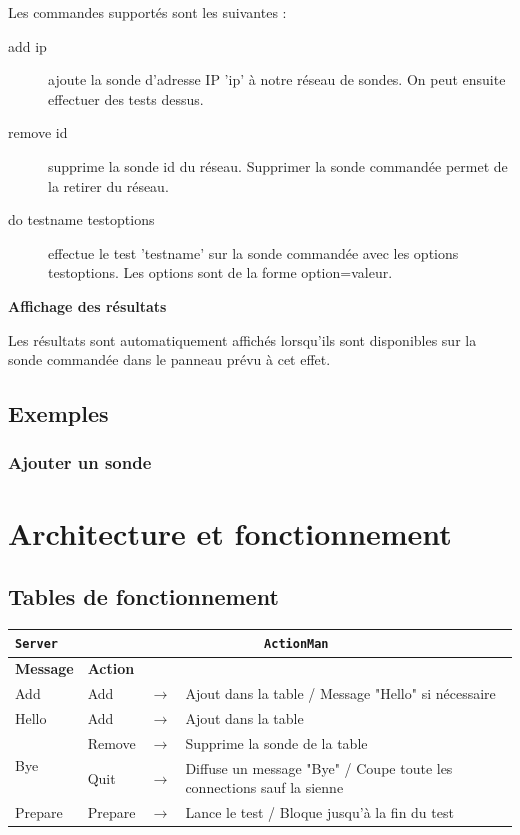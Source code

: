 \documentclass[a4paper,11pt]{article}
\newcommand{\cd}[1]{\texttt{#1}}
\begin{document}
\FloatBarrier
Les commandes supportés sont les suivantes :
\begin{description}
\item[add ip] ajoute la sonde d'adresse IP 'ip' à notre réseau de sondes. On peut ensuite effectuer des tests dessus.
\item[remove id] supprime la sonde id du réseau. Supprimer la sonde commandée permet de la retirer du réseau.
\item[do testname testoptions] effectue le test 'testname' sur la sonde commandée avec les options testoptions. Les options sont de la forme option=valeur.
\end{description}
\vspace{2ex}
\textbf{Affichage des résultats}

Les résultats sont automatiquement affichés lorsqu'ils sont disponibles sur la sonde commandée dans le panneau prévu à cet effet.


\subsection{Exemples}

\subsubsection{Ajouter un sonde}






\newpage
\section{Architecture et fonctionnement}

\subsection{Tables de fonctionnement}
\begin{center}
\begin{tabular}{|l|l|c|l|}
\hline
\cd{Server} & \multicolumn{3}{|c|}{\cd{ActionMan}} \\
\hline
\textbf{Message} & \textbf{Action} & & \\
\hline
Add & Add & $\longrightarrow$ & Ajout dans la table / Message "Hello" si nécessaire\\
\hline
Hello & Add & $\longrightarrow$ & Ajout dans la table\\
\hline
\multirow{2}{*}{Bye} & Remove & $\longrightarrow$ & Supprime la sonde de la table\\
\cline{2-4}
 & Quit & $\longrightarrow$ & Diffuse un message "Bye" / Coupe toute les connections sauf la sienne\\
\hline
Prepare & Prepare & $\longrightarrow$ & Lance le test / Bloque jusqu'à la fin du test \\
\hline
\end{tabular}
\end{center}
\end{document}

